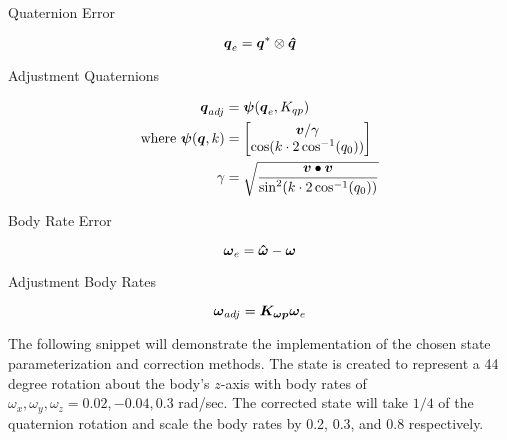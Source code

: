 Quaternion Error

\begin{equation}
  \boldsymbol{q}_e = \boldsymbol{q}^* \otimes \boldsymbol{\hat{q}}
\end{equation}

Adjustment Quaternions

\begin{equation}
  \begin{aligned}
    \boldsymbol{q}_{adj} &= \boldsymbol{\psi}(\boldsymbol{q}_e, K_{qp}) \\
    \text{where } \boldsymbol{\psi}(\boldsymbol{q}, k) &= \begin{bmatrix} \boldsymbol{v} / \gamma \\ \cos ( k \cdot 2\cos^{-1} (q_0))  \end{bmatrix} \\
    \gamma &= \sqrt{\frac{\boldsymbol{v} \bullet \boldsymbol{v}}{\sin^2 ( k \cdot 2\cos^{-1} (q_0))}}
  \end{aligned}
\end{equation}

Body Rate Error

\begin{equation}
  \boldsymbol{\omega}_e = \boldsymbol{\hat{\omega}} - \boldsymbol{\omega}
\end{equation}

Adjustment Body Rates

\begin{equation}
  \boldsymbol{\omega}_{adj} = \boldsymbol{K_{\omega p}} \boldsymbol{\omega}_e
\end{equation}

The following snippet will demonstrate the implementation of the chosen state parameterization and correction methods.  The state is created to represent a 44 degree rotation about the body's $z$-axis with body rates of $\omega_x, \omega_y, \omega_z = 0.02, -0.04, 0.3$ rad/sec.  The corrected state will take $1/4$ of the quaternion rotation and scale the body rates by 0.2, 0.3, and 0.8 respectively.

